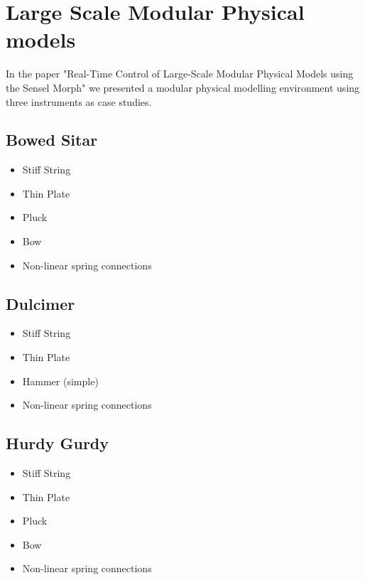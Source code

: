 \chapter{Large Scale Modular Physical models}
In the paper "Real-Time Control of Large-Scale Modular Physical Models using the Sensel Morph"  \cite{paper:Willemsen2019} we presented a modular physical modelling environment using three instruments as case studies. 

\section{Bowed Sitar}
\begin{itemize}
    \item Stiff String
    \item Thin Plate
    \item Pluck
    \item Bow
    \item Non-linear spring connections
\end{itemize}

\section{Dulcimer}
\begin{itemize}
    \item Stiff String
    \item Thin Plate
    \item Hammer (simple)
    \item Non-linear spring connections
\end{itemize}

\section{Hurdy Gurdy}
\begin{itemize}
    \item Stiff String
    \item Thin Plate
    \item Pluck
    \item Bow
    \item Non-linear spring connections
\end{itemize}
